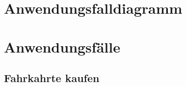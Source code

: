 \documentclass{lastenheft}
\begin{document}
\section{Anwendungsfalldiagramm}

%



\clearpage

\section{Anwendungsfälle}
\subsection{Fahrkahrte kaufen}
\end{document}
